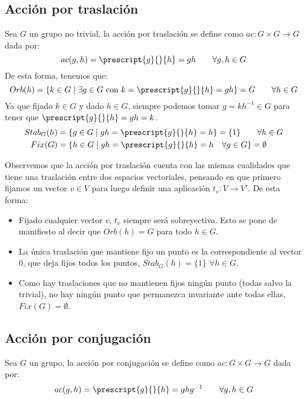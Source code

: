 \subsection{Acción por traslación}
\noindent
Sea $G$ un grupo no trivial, la acción por traslación se define como $ac:G\times G\to G$ dada por:
\begin{equation*}
    ac(g,h) = \prescript{g}{}{h} = gh \qquad \forall g,h\in G
\end{equation*}
De esta forma, tenemos que:
\begin{equation*}
    Orb(h) = \{k\in G \mid \exists g\in G \text{\ con\ } k = \prescript{g}{}{h} = gh\} = G \qquad \forall h\in G
\end{equation*}
Ya que fijado $k\in G$ y dado $h\in G$, siempre podemos tomar $g = kh^{-1}\in G$ para tener que $\prescript{g}{}{h} = gh = k$.
\begin{align*}
    Stab_G(h) &= \{g\in G \mid gh = \prescript{g}{}{h} = h\} = \{1\} \qquad \forall h\in G\\
    Fix(G) &= \{h\in G \mid gh = \prescript{g}{}{h}=h \quad \forall g\in G\} = \emptyset 
\end{align*}

\begin{observacion}
    Observemos que la acción por traslación cuenta con las mismas cualidades que tiene una traslación entre dos espacios vectoriales, pensando en que primero fijamos un vector $v\in V$ para luego definir una aplicación $t_v:V\to V'$. De esta forma:
    \begin{itemize}
        \item Fijado cualquier vector $v$, $t_v$ siempre será sobreyectiva. Esto se pone de manifiesto al decir que $Orb(h) = G$ para todo $h\in G$.
        \item La única traslación que mantiene fijo un punto es la correspondiente al vector 0, que deja fijos todos los puntos, $Stab_G(h) = \{1\}$ $\forall h\in G$.
        \item Como hay traslaciones que no mantienen fijos ningún punto (todas salvo la trivial), no hay ningún punto que permanezca invariante ante todas ellas, $Fix(G) = \emptyset $.
    \end{itemize}
\end{observacion}

\subsection{Acción por conjugación}
\noindent
Sea $G$ un grupo, la acción por conjugación se define como $ac:G\times G\to G$ dada por:
\begin{equation*}
    ac(g,h) = \prescript{g}{}{h} = ghg^{-1} \qquad \forall g,h\in G
\end{equation*}

